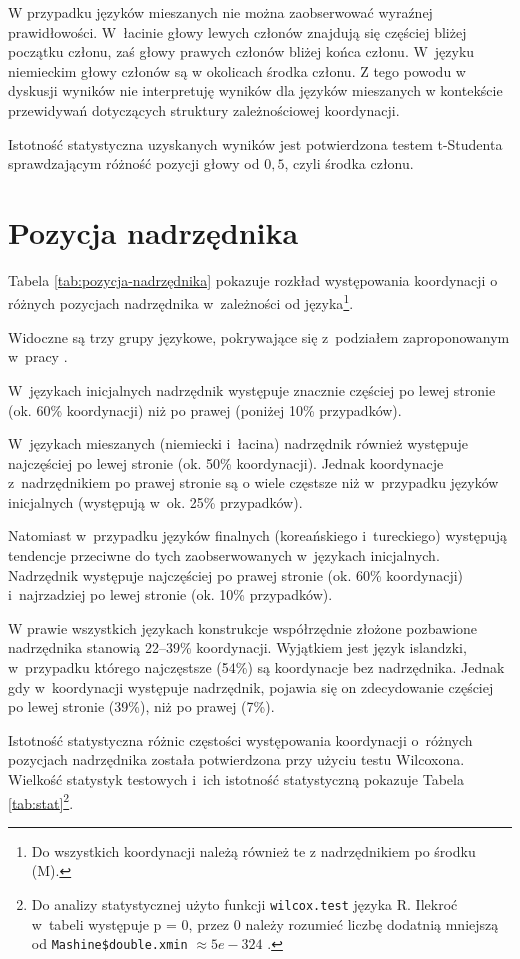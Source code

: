 W przypadku języków mieszanych nie można zaobserwować wyraźnej prawidłowości. W~łacinie głowy lewych członów znajdują się częściej bliżej początku członu, zaś głowy prawych członów bliżej końca członu. W~języku niemieckim głowy członów są w okolicach środka członu. Z tego powodu w dyskusji wyników nie interpretuję wyników dla języków mieszanych w kontekście przewidywań dotyczących struktury zależnościowej koordynacji.

Istotność statystyczna uzyskanych wyników jest potwierdzona testem t-Studenta sprawdzającym różność pozycji głowy od $0,5$, czyli środka członu.

\section{Pozycja nadrzędnika}

Tabela \ref{tab:pozycja-nadrzędnika} pokazuje rozkład występowania koordynacji o różnych pozycjach nadrzędnika w~zależności od języka\footnote{
Do wszystkich koordynacji należą również te z nadrzędnikiem po środku (M).}.



Widoczne są trzy grupy językowe, pokrywające się z~podziałem zaproponowanym w~pracy \cite{polinsky2012headedness}.

W~językach inicjalnych nadrzędnik występuje znacznie częściej po lewej stronie (ok. 60\% koordynacji) niż po prawej (poniżej 10\% przypadków).

W~językach mieszanych (niemiecki i~łacina) nadrzędnik również występuje najczęściej po lewej stronie (ok. 50\% koordynacji). Jednak koordynacje z~nadrzędnikiem po prawej stronie są o wiele częstsze niż w~przypadku języków inicjalnych (występują w~ok. 25\% przypadków).

Natomiast w~przypadku języków finalnych (koreańskiego i~tureckiego) występują tendencje przeciwne do tych zaobserwowanych w~językach inicjalnych. Nadrzędnik występuje najczęściej po prawej stronie (ok. 60\% koordynacji) i~najrzadziej po lewej stronie (ok. 10\% przypadków). 

W prawie wszystkich językach konstrukcje współrzędnie złożone pozbawione nadrzędnika stanowią 22--39\% koordynacji.  Wyjątkiem jest język islandzki, w~przypadku którego najczęstsze (54\%) są koordynacje bez nadrzędnika. Jednak gdy w~koordynacji występuje nadrzędnik, pojawia się on zdecydowanie częściej po lewej stronie (39\%), niż po prawej (7\%).

Istotność statystyczna różnic częstości występowania koordynacji o~różnych pozycjach nadrzędnika została  potwierdzona przy użyciu testu Wilcoxona. Wielkość statystyk testowych i~ich istotność statystyczną pokazuje Tabela \ref{tab:stat}\footnote{
Do analizy statystycznej użyto funkcji \texttt{wilcox.test} języka R. Ilekroć w~tabeli występuje p = 0, przez 0 należy rozumieć liczbę dodatnią mniejszą od \texttt{Mashine\$double.xmin} $\approx 5e-324$ \citep{R2023}.}.


